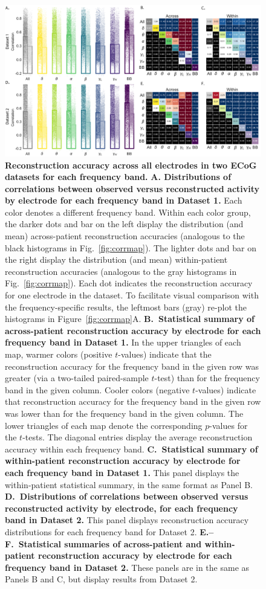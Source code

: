 \documentclass[11pt]{article}
\begin{document}
\begin{figure}
  \centering \includegraphics[width=\textwidth]{figs/frequency}
  \caption{\textbf{Reconstruction accuracy across all electrodes in two ECoG
  datasets for each frequency band.} \textbf{A. Distributions of correlations
  between observed versus reconstructed activity by electrode for each frequency
  band in Dataset 1.}  Each color denotes a different frequency band. Within
  each color group, the darker dots and bar on the left display the distribution
  (and mean) across-patient reconstruction accuracies (analogous to the black
  histograms in Fig.~\ref{fig:corrmap}).  The lighter dots and bar on the right
  display the distribution (and mean) within-patient reconstruction accuracies
  (analogous to the gray histograms in Fig.~\ref{fig:corrmap}). Each dot
  indicates the reconstruction accuracy for one electrode in the dataset. To
  facilitate visual comparison with the frequency-specific results, the leftmost
  bars (gray) re-plot the histograms in Figure~\ref{fig:corrmap}A.
  \textbf{B.~Statistical summary of across-patient reconstruction accuracy by
  electrode for each frequency band in Dataset 1.} In the upper triangles of
  each map, warmer colors (positive $t$-values) indicate that the reconstruction
  accuracy for the frequency band in the given row was greater (via a two-tailed
  paired-sample $t$-test) than for the frequency band in the given column.
  Cooler colors (negative $t$-values) indicate that reconstruction accuracy for
  the frequency band in the given row was lower than for the frequency band in
  the given column. The lower triangles of each map denote the corresponding
  $p$-values for the $t$-tests. The diagonal entries display the average
  reconstruction accuracy within each frequency band. \textbf{C.~Statistical
  summary of within-patient reconstruction accuracy by electrode for each
  frequency band in Dataset 1.} This panel displays the within-patient
  statistical summary, in the same format as Panel B. \textbf{D.~Distributions
  of correlations between observed versus reconstructed activity by electrode,
  for each frequency band in Dataset 2.} This panel displays reconstruction
  accuracy distributions for each frequency band for Dataset 2.
  \textbf{E.--F.~Statistical summaries of across-patient and within-patient
  reconstruction accuracy by electrode for each frequency band in Dataset 2.}
  These panels are in the same as Panels B and C, but display results from
  Dataset 2.} \label{fig:frequency}
\end{figure}
\end{document}
